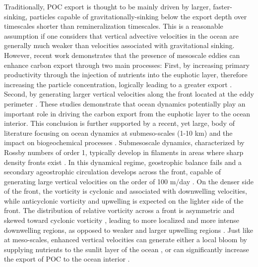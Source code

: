 \documentclass[draft,linenumbers]{agujournal2018}
\begin{document}
Traditionally, POC export is thought to be mainly driven by larger, faster-sinking, particles capable of gravitationally-sinking below the export depth over timescales shorter than remineralization timescales. This is a reasonable assumption if one considers that vertical advective velocities in the ocean are generally much weaker than velocities associated with gravitational sinking. However, recent work demonstrates that the presence of mesoscale eddies can enhance carbon export through two main processes: First, by increasing primary productivity through the injection of nutrients into the euphotic layer, therefore increasing the particle concentration, logically leading to a greater export \citep{Levy_1998}. Second, by generating larger vertical velocities along the front located at the eddy perimeter \citep{vanHaren_2006, Waite_2016}. These studies demonstrate that ocean dynamics potentially play an important role in driving the carbon export from the euphotic layer to the ocean interior. This conclusion is further supported by a recent, yet large, body of literature focusing on ocean dynamics at submeso-scales (1-10 km) and the impact on biogeochemical processes \citep[see reviews in][]{Thomas_2008,Klein_2009,Mahadevan_2016}. Submesoscale dynamics, characterized by Rossby numbers of order 1, typically develop in filaments in areas where sharp density fronts exist \citep{McWilliams_2016}. In this dynamical regime, geostrophic balance fails and a secondary ageostrophic circulation develops across the front, capable of generating large vertical velocities on the order of 100 m/day \citep{FoxKemper_2008,Mahadevan_2016}. On the denser side of the front, the vorticity is cyclonic and associated with downwelling velocities, while anticyclonic vorticity and upwelling is expected on the lighter side of the front. The distribution of relative vorticity across a front is asymmetric and skewed toward cyclonic vorticity \citep{Rudnick_2001}, leading to more localized and more intense downwelling regions, as opposed to weaker and larger upwelling regions \citep{Mahadevan_2006}. Just like at meso-scales, enhanced vertical velocities can generate either a local bloom by supplying nutrients to the sunlit layer of the ocean \citep{Mahadevan_2012}, or can significantly increase the export of POC to the ocean interior \citep{Levy_2012, Estapa_2015,Omand_2015}. 
\end{document}
